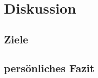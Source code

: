 \chapter{Diskussion}

\section{Ziele}
\label{chap:dis_ziele}

\section{persönliches Fazit}
\label{chap:dis_fazit}